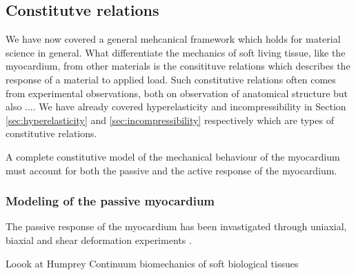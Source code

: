\subsection{Constitutve relations}
We have now covered a general mehcanical framework which holds for
material science in general. What differentiate the mechanics of soft
living tissue, like the myocardium, from other materials is the
consitituve relations which describes the response of a material to
applied load. Such constitutive relations often comes from
experimental observations, both on observation of anatomical structure
but also ....
We have already covered hyperelasticity and incompressibility in Section
\ref{sec:hyperelasticity} and \ref{sec:incompressibility} respectively
which are types of constitutive relations.

A complete constitutive model of the mechanical behaviour of the
myocardium must account for both the passive and the active response
of the myocardium.


\subsubsection{Modeling of the passive myocardium}

The passive response of the myocardium has been invastigated through
uniaxial, biaxial and shear deformation experiments \cite{dokos2002shear}.

Loook at Humprey Continuum biomechanics of
soft biological tissues


